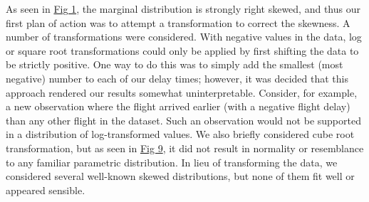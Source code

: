 \documentclass[12pt, a4paper, openany]{book}
\newcommand\tab[1][1cm]{\hspace*{#1}}
\begin{document}
	\tab As seen in \underline{Fig 1}, the marginal distribution is strongly right skewed, and thus our first plan of action was to attempt a transformation to correct the skewness. A number of transformations were considered. With negative values in the data, log or square root transformations could only be applied by first shifting the data to be strictly positive. One way to do this was to simply add the smallest (most negative) number to each of our delay times; however, it was decided that this approach rendered our results somewhat uninterpretable. Consider, for example, a new observation where the flight arrived earlier (with a negative flight delay) than any other flight in the dataset. Such an observation would not be supported in a distribution of log-transformed values. We also briefly considered cube root transformation, but as seen in \underline{Fig 9}, it did not result in normality or resemblance to any familiar parametric distribution. In lieu of transforming the data, we considered several well-known skewed distributions, but none of them fit well or appeared sensible.\\
\end{document}
